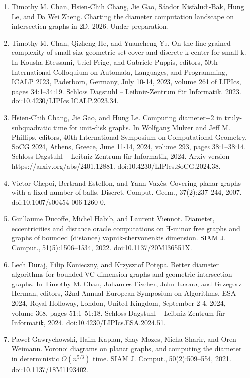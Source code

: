 \documentclass[10pt,a4paper]{article}
\begin{document}
\begin{enumerate}
\item[]  [9]  Timothy M. Chan, Hsien-Chih Chang, Jie Gao, Sándor Kisfaludi-Bak, Hung Le, and Da Wei Zheng.  Charting the diameter computation landscape on intersection graphs in 2D, 2026.  Under preparation.  
\item[]  [10]  Timothy M. Chan, Qizheng He, and Yuancheng Yu.  On the fine-grained complexity of small-size geometric set cover and discrete k-center for small k.  In Kousha Etessami, Uriel Feige, and Gabriele Puppis, editors, 50th International Colloquium on Automata, Languages, and Programming, ICALP 2023, Paderborn, Germany, July 10-14, 2023, volume 261 of LIPIcs, pages 34:1–34:19. Schloss Dagstuhl – Leibniz-Zentrum für Informatik, 2023.  doi:10.4230/LIPIcs.ICALP.2023.34.  
\item[]  [11]  Hsien-Chih Chang, Jie Gao, and Hung Le.  Computing diameter+2 in truly-subquadratic time for unit-disk graphs.  In Wolfgang Mulzer and Jeff M. Phillips, editors, 40th International Symposium on Computational Geometry, SoCG 2024, Athens, Greece, June 11-14, 2024, volume 293, pages 38:1–38:14. Schloss Dagstuhl – Leibniz-Zentrum für Informatik, 2024.  Arxiv version https://arxiv.org/abs/2401.12881.  doi:10.4230/LIPIcs.SoCG.2024.38.  
\item[]  [12]  Victor Chepoi, Bertrand Estellon, and Yann Vaxès.  Covering planar graphs with a fixed number of balls.  Discret. Comput. Geom., 37(2):237–244, 2007.  doi:10.1007/s00454-006-1260-0.  
\item[]  [13]  Guillaume Ducoffe, Michel Habib, and Laurent Viennot.  Diameter, eccentricities and distance oracle computations on H-minor free graphs and graphs of bounded (distance) vapnik-chervonenkis dimension.  SIAM J. Comput., 51(5):1506–1534, 2022.  doi:10.1137/20M136551X.  
\item[]  [14]  Lech Duraj, Filip Konieczny, and Krzysztof Potępa.  Better diameter algorithms for bounded VC-dimension graphs and geometric intersection graphs.  In Timothy M. Chan, Johannes Fischer, John Iacono, and Grzegorz Herman, editors, 32nd Annual European Symposium on Algorithms, ESA 2024, Royal Holloway, London, United Kingdom, September 2-4, 2024, volume 308, pages 51:1–51:18. Schloss Dagstuhl – Leibniz-Zentrum für Informatik, 2024.  doi:10.4230/LIPIcs.ESA.2024.51.  
\item[]  [15]  Paweł Gawrychowski, Haim Kaplan, Shay Mozes, Micha Sharir, and Oren Weimann.  Voronoi diagrams on planar graphs, and computing the diameter in deterministic $\tilde{O}(n^{5/3})$ time.  SIAM J. Comput., 50(2):509–554, 2021.  doi:10.1137/18M1193402.  

\end{enumerate}
\end{document}
